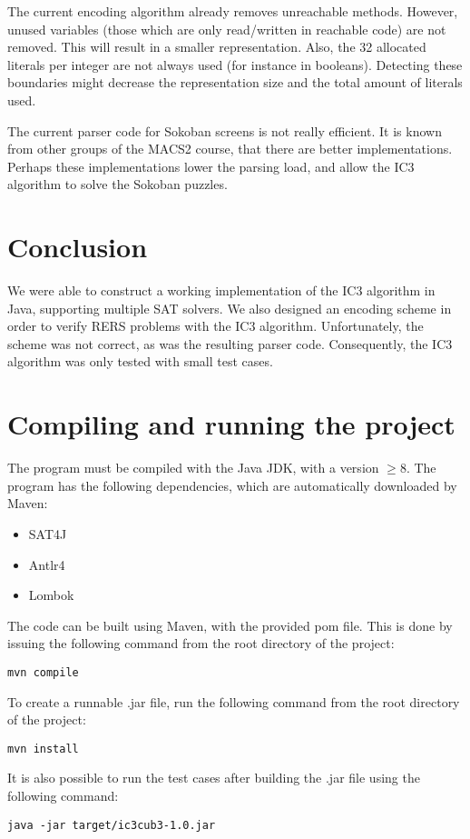 \documentclass[a4paper]{article}
\begin{document}
The current encoding algorithm already removes unreachable methods. However, unused variables (those which are only read/written in reachable code) are not removed. This will result in a smaller representation. Also, the 32 allocated literals per integer are not always used (for instance in booleans). Detecting these boundaries might decrease the representation size and the total amount of literals used.

The current parser code for Sokoban screens is not really efficient.
It is known from other groups of the MACS2 course, that there are better implementations. Perhaps these implementations lower the parsing load, and allow the IC3 algorithm to solve the Sokoban puzzles.

\section{Conclusion}
We were able to construct a working implementation of the IC3 algorithm in Java, supporting multiple SAT solvers. We also designed an encoding scheme in order to verify RERS problems with the IC3 algorithm. Unfortunately, the scheme was not correct, as was the resulting parser code. Consequently, the IC3 algorithm was only tested with small test cases.




\newpage
\appendix
\section{Compiling and running the project}
The program must be compiled with the Java JDK, with a version $\geq 8$. The program has the following dependencies, which are automatically downloaded by Maven:
\begin{itemize}
\item SAT4J
\item Antlr4
\item Lombok
\end{itemize}

The code can be built using Maven, with the provided pom file. This is done by issuing the following command from the root directory of the project:

\texttt{mvn compile}

To create a runnable .jar file, run the following command from the root directory of the project:

\texttt{mvn install}

It is also possible to run the test cases after building the .jar file using the following command:

\texttt{java -jar target/ic3cub3-1.0.jar}
\end{document}
